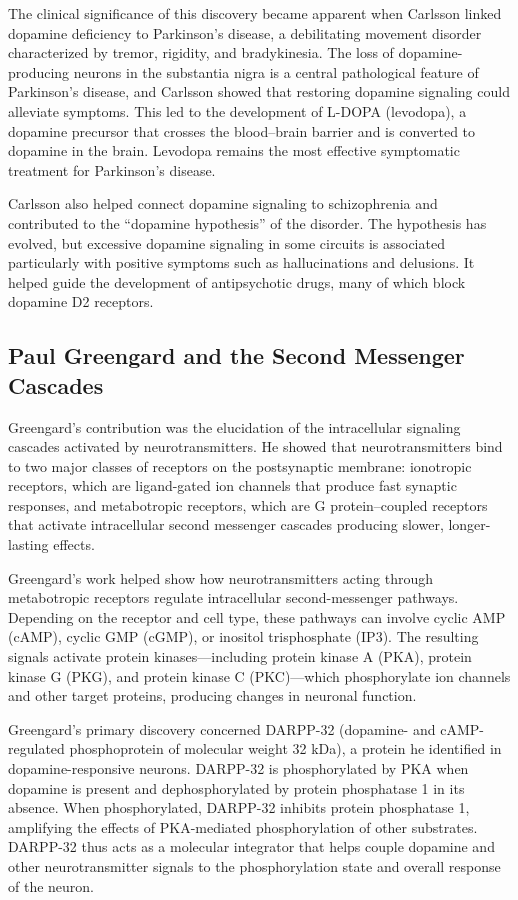 The clinical significance of this discovery became apparent when Carlsson linked dopamine deficiency to Parkinson's disease, a debilitating movement disorder characterized by tremor, rigidity, and bradykinesia. The loss of dopamine-producing neurons in the substantia nigra is a central pathological feature of Parkinson's disease, and Carlsson showed that restoring dopamine signaling could alleviate symptoms. This led to the development of L-DOPA (levodopa), a dopamine precursor that crosses the blood--brain barrier and is converted to dopamine in the brain. Levodopa remains the most effective symptomatic treatment for Parkinson's disease.

Carlsson also helped connect dopamine signaling to schizophrenia and contributed to the ``dopamine hypothesis'' of the disorder. The hypothesis has evolved, but excessive dopamine signaling in some circuits is associated particularly with positive symptoms such as hallucinations and delusions. It helped guide the development of antipsychotic drugs, many of which block dopamine D2 receptors.

\subsection{Paul Greengard and the Second Messenger Cascades}

Greengard's contribution was the elucidation of the intracellular signaling cascades activated by neurotransmitters. He showed that neurotransmitters bind to two major classes of receptors on the postsynaptic membrane: ionotropic receptors, which are ligand-gated ion channels that produce fast synaptic responses, and metabotropic receptors, which are G protein--coupled receptors that activate intracellular second messenger cascades producing slower, longer-lasting effects.

Greengard's work helped show how neurotransmitters acting through metabotropic receptors regulate intracellular second-messenger pathways. Depending on the receptor and cell type, these pathways can involve cyclic AMP (cAMP), cyclic GMP (cGMP), or inositol trisphosphate (IP3). The resulting signals activate protein kinases---including protein kinase A (PKA), protein kinase G (PKG), and protein kinase C (PKC)---which phosphorylate ion channels and other target proteins, producing changes in neuronal function.

Greengard's primary discovery concerned DARPP-32 (dopamine- and cAMP-regulated phosphoprotein of molecular weight 32 kDa), a protein he identified in dopamine-responsive neurons. DARPP-32 is phosphorylated by PKA when dopamine is present and dephosphorylated by protein phosphatase 1 in its absence. When phosphorylated, DARPP-32 inhibits protein phosphatase 1, amplifying the effects of PKA-mediated phosphorylation of other substrates. DARPP-32 thus acts as a molecular integrator that helps couple dopamine and other neurotransmitter signals to the phosphorylation state and overall response of the neuron.

